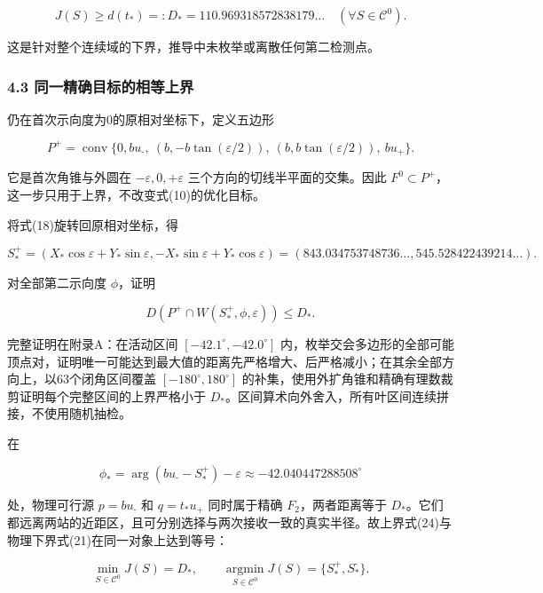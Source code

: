 \documentclass[
  11pt,
  fontset=none]{ctexart}
\begin{document}
\[
J(S)\ge d(t_{\text{*}})=:D_{\text{*}}=110.969318572838179\ldots\quad(\forall S\in\mathcal C^0). \tag{21}
\]

这是针对整个连续域的下界，推导中未枚举或离散任何第二检测点。

\subsubsection{4.3
同一精确目标的相等上界}\label{ux540cux4e00ux7cbeux786eux76eeux6807ux7684ux76f8ux7b49ux4e0aux754c}

仍在首次示向度为0的原相对坐标下，定义五边形

\[
P^{\text{+}}=\operatorname{conv}\{0,
 b u_{\text{-}},\ (b,-b\tan(\varepsilon/2)),\
 (b,b\tan(\varepsilon/2)),\ b u_{\text{+}}\}. \tag{22}
\]

它是首次角锥与外圆在 \(-\varepsilon,0,+\varepsilon\)
三个方向的切线半平面的交集。因此
\(F^0\subset P^{\text{+}}\)，这一步只用于上界，不改变式(10)的优化目标。

将式(18)旋转回原相对坐标，得

\[
S_{\text{*}}^{\text{+}}=(X_{\text{*}}\cos\varepsilon+Y_{\text{*}}\sin\varepsilon,
 -X_{\text{*}}\sin\varepsilon+Y_{\text{*}}\cos\varepsilon)
=(843.034753748736\ldots,545.528422439214\ldots). \tag{23}
\]

对全部第二示向度 \(\phi\)，证明

\[
D(P^{\text{+}}\cap W(S_{\text{*}}^{\text{+}},\phi,\varepsilon))\le D_{\text{*}}. \tag{24}
\]

完整证明在附录A：在活动区间 \([-42.1^\circ,-42.0^\circ]\)
内，枚举交会多边形的全部可能顶点对，证明唯一可能达到最大值的距离先严格增大、后严格减小；在其余全部方向上，以63个闭角区间覆盖
\([-180^\circ,180^\circ]\)
的补集，使用外扩角锥和精确有理数裁剪证明每个完整区间的上界严格小于
\(D_{\text{*}}\)。区间算术向外舍入，所有叶区间连续拼接，不使用随机抽检。

在

\[
\phi_{\text{*}} =\arg(bu_{\text{-}}-S_{\text{*}}^{\text{+}})-\varepsilon
\approx-42.040447288508^\circ
\]

处，物理可行源 \(p=bu_{\text{-}}\) 和 \(q=t_{\text{*}}u_{\text{+}}\)
同时属于精确 \(F_2\)，两者距离等于
\(D_{\text{*}}\)。它们都远离两站的近距区，且可分别选择与两次接收一致的真实半径。故上界式(24)与物理下界式(21)在同一对象上达到等号：

\[
\boxed{\min_{S\in\mathcal C^0}J(S)=D_{\text{*}},\qquad
\operatorname*{argmin}_{S\in\mathcal C^0}J(S)=\{S_{\text{*}}^{\text{+}},S_{\text{*}}^{\text{-}}\}.} \tag{25}
\]
\end{document}
